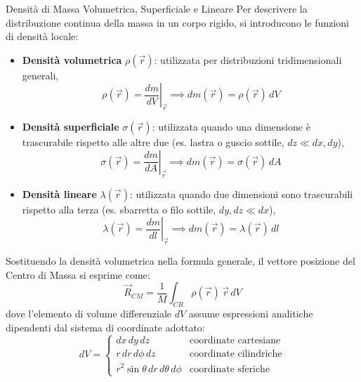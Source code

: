 \begin{definizione}{Densità di Massa Volumetrica, Superficiale e Lineare}
Per descrivere la distribuzione continua della massa in un corpo rigido, si introducono le funzioni di densità locale:
\begin{itemize}
    \item \textbf{Densità volumetrica} $\rho(\vec{r})$: utilizzata per distribuzioni tridimensionali generali,
    \begin{equation}
        \rho(\vec{r}) = \left. \frac{dm}{dV} \right|_{\vec{r}} \implies dm(\vec{r}) = \rho(\vec{r}) \, dV
    \end{equation}
    \item \textbf{Densità superficiale} $\sigma(\vec{r})$: utilizzata quando una dimensione è trascurabile rispetto alle altre due (es. lastra o guscio sottile, $dz \ll dx, dy$),
    \begin{equation}
        \sigma(\vec{r}) = \left. \frac{dm}{dA} \right|_{\vec{r}} \implies dm(\vec{r}) = \sigma(\vec{r}) \, dA
    \end{equation}
    \item \textbf{Densità lineare} $\lambda(\vec{r})$: utilizzata quando due dimensioni sono trascurabili rispetto alla terza (es. sbarretta o filo sottile, $dy, dz \ll dx$),
    \begin{equation}
        \lambda(\vec{r}) = \left. \frac{dm}{dl} \right|_{\vec{r}} \implies dm(\vec{r}) = \lambda(\vec{r}) \, dl
    \end{equation}
\end{itemize}
\end{definizione}

Sostituendo la densità volumetrica nella formula generale, il vettore posizione del Centro di Massa si esprime come:
\begin{equation}
    \vec{R}_{CM} = \frac{1}{M} \int_{CR} \rho(\vec{r}) \, \vec{r} \, dV
\end{equation}
dove l'elemento di volume differenziale $dV$ assume espressioni analitiche dipendenti dal sistema di coordinate adottato:
\begin{equation*}
dV = 
\begin{cases} 
dx \, dy \, dz & \text{coordinate cartesiane} \\ 
r \, dr \, d\phi \, dz & \text{coordinate cilindriche} \\ 
r^2 \sin\theta \, dr \, d\theta \, d\phi & \text{coordinate sferiche} 
\end{cases}
\end{equation*}


